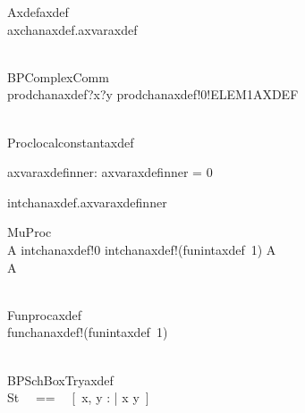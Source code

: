 \begin{circus}
 \circprocess Axdefaxdef \circdef \circbegin \\
    \circspot axchanaxdef.axvaraxdef \then \Skip \\
 \circend \\
\end{circus}

\begin{circus}
 \circprocess BPComplexComm \circdef \circbegin \\
    \circspot prodchanaxdef?x?y \then prodchanaxdef!0!ELEM1AXDEF \then \Skip \\
 \circend \\
\end{circus}

\begin{circus}
\circprocess Proclocalconstantaxdef \circdef \circbegin \\
\end{circus}
 \begin{axdef}
  axvaraxdefinner: \nat
\where
  axvaraxdefinner = 0
\end{axdef}
\begin{circusaction}
\circspot intchanaxdef.axvaraxdefinner \then \Skip \\
\end{circusaction}
\begin{circus}
 \circend
\end{circus}

\begin{circus}
 \circprocess MuProc \circdef \circbegin \\
    A \circdef intchanaxdef!0 \then intchanaxdef!(funintaxdef~1) \then A \\
    \circspot A \\
 \circend \\
\end{circus}

\begin{circus}
 \circprocess Funprocaxdef \circdef \circbegin \\
    \circspot funchanaxdef!(funintaxdef~1) \then \Skip \\
 \circend \\
\end{circus}

\begin{circus}
 \circprocess BPSchBoxTryaxdef \circdef \circbegin \\
    \circstate St ~~==~~ [~x, y : \nat | x \neq y~] \\
    \circspot \Skip \\
 \circend \\
\end{circus}

